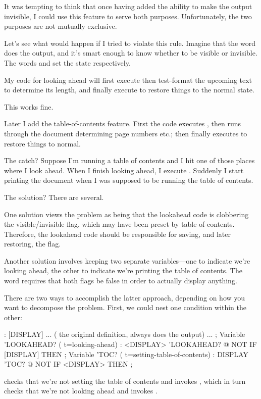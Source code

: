 It was tempting to think that once having added the ability to make
the output invisible, I could use this feature to serve both purposes.
Unfortunately, the two purposes are not mutually exclusive.

Let's see what would happen if I tried to violate this rule. Imagine
that the word  does the output, and it's smart enough
to know whether to be visible or invisible. The words 
and  set the state respectively.

My code for looking ahead will first execute  then
test-format the upcoming text to determine its length, and finally
execute  to restore things to the normal state.

This works fine.

Later I add the table-of-contents feature. First the code executes
, then runs through the document determining page
numbers etc.; then finally executes  to restore things
to normal.

The catch? Suppose I'm running a table of contents and I hit one of
those places where I look ahead. When I finish looking ahead, I
execute . Suddenly I start printing the document when I
was supposed to be running the table of contents.

The solution? There are several.

One solution views the problem as being that the lookahead code is
clobbering the visible/invisible flag, which may have been preset by
table-of-contents. Therefore, the lookahead code should be responsible for
saving, and later restoring, the flag.

Another solution involves keeping two separate variables---one to
indicate we're looking ahead, the other to indicate we're printing the
table of contents. The word  requires that both flags
be false in order to actually display anything.

There are two ways to accomplish the latter approach, depending on
how you want to decompose the problem. First, we could nest one condition
within the other:

\begin{Code}
: [DISPLAY]  ...
     ( the original definition, always does the output) ... ;
Variable 'LOOKAHEAD?  ( t=looking-ahead)
: <DISPLAY>   'LOOKAHEAD? @ NOT IF  [DISPLAY]  THEN ;
Variable 'TOC?  ( t=setting-table-of-contents)
: DISPLAY   'TOC? @ NOT IF  <DISPLAY>  THEN ;
\end{Code}
{\sloppy
{} checks that we're not setting the table of contents
and invokes , which in turn checks that we're not
looking ahead and invokes \forth{[DISPLAY]}.

}

